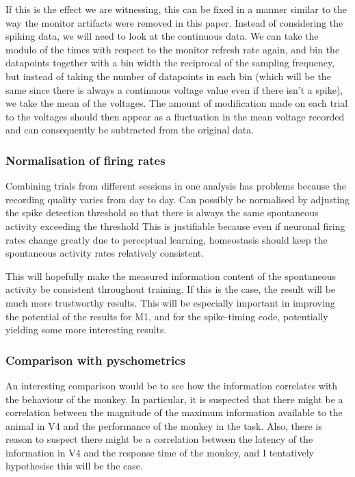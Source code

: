 If this is the effect we are witnessing, this can be fixed in a manner similar to the way the monitor artifacts were removed in this paper.
Instead of considering the spiking data, we will need to look at the continuous data.
We can take the modulo of the times with respect to the monitor refresh rate again, and bin the datapoints together with a bin width the reciprocal of the sampling frequency, but instead of taking the number of datapoints in each bin (which will be the same since there is always a continuous voltage value even if there isn't a spike), we take the mean of the voltages.
The amount of modification made on each trial to the voltages should then appear as a fluctuation in the mean voltage recorded and can consequently be subtracted from the original data.

\subsubsection{Normalisation of firing rates}

Combining trials from different sessions in one analysis has problems because the recording quality varies from day to day.
Can possibly be normalised by adjusting the spike detection threshold so that there is always the same spontaneous activity exceeding the threshold
This is justifiable because even if neuronal firing rates change greatly due to perceptual learning, homeostasis should keep the spontaneous activity rates relatively consistent.

This will hopefully make the measured information content of the spontaneous activity be consistent throughout training.
If this is the case, the result will be much more trustworthy results.
This will be especially important in improving the potential of the results for \ac{M1}, and for the spike-timing code, potentially yielding some more interesting results.

\subsubsection{Comparison with pyschometrics}

An interesting comparison would be to see how the information correlates with the behaviour of the monkey.
In particular, it is suspected that there might be a correlation between the magnitude of the maximum information available to the animal in \ac{V4} and the performance of the monkey in the task.
Also, there is reason to suspect there might be a correlation between the latency of the information in \ac{V4} and the response time of the monkey, and I tentatively hypothesise this will be the case.

